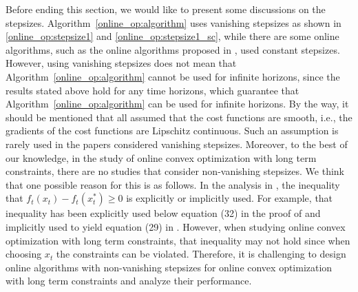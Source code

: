 \documentclass[12pt,draftcls,onecolumn]{IEEEtran}%
\begin{document}
Before ending this section, we would like to present some discussions on the stepsizes. Algorithm~\ref{online_op:algorithm} uses vanishing stepsizes as shown in \eqref{online_op:stepsize1} and \eqref{online_op:stepsize1_sc}, while there are some online algorithms, such as the online algorithms proposed in \cite{yi2016tracking,mokhtari2016online,zhang2019distributed,carnevale2020distributed}, used constant stepsizes. However, using vanishing stepsizes does not mean that Algorithm~\ref{online_op:algorithm} cannot be used for infinite horizons, since the results stated above hold for any time horizons, which guarantee that Algorithm~\ref{online_op:algorithm} can be used for infinite horizons. 
By the way, it should be mentioned that \cite{yi2016tracking,mokhtari2016online,zhang2019distributed,carnevale2020distributed} all assumed that the cost functions are smooth, i.e., the gradients of the cost functions are Lipschitz continuous. Such an assumption is rarely used in the papers considered  vanishing stepsizes.
Moreover, to the best of our knowledge, in the study of online convex optimization with long term constraints, there are no studies that consider non-vanishing stepsizes. We think that one possible reason for this is as follows. In the analysis in \cite{yi2016tracking,mokhtari2016online,zhang2019distributed,carnevale2020distributed}, the inequality that $f_t(x_t)-f_t(x^*_t)\ge0$ is explicitly or implicitly used. For example, that inequality has been explicitly used below equation (32) in the proof of \cite{yi2016tracking} and implicitly used to yield equation (29) in \cite{carnevale2020distributed}. However, when studying online convex optimization with long term constraints, that inequality may not hold since when choosing $x_t$ the constraints can be violated. Therefore, it is challenging to design online algorithms with non-vanishing stepsizes for online convex optimization with long term constraints and analyze their performance. 
\end{document}
